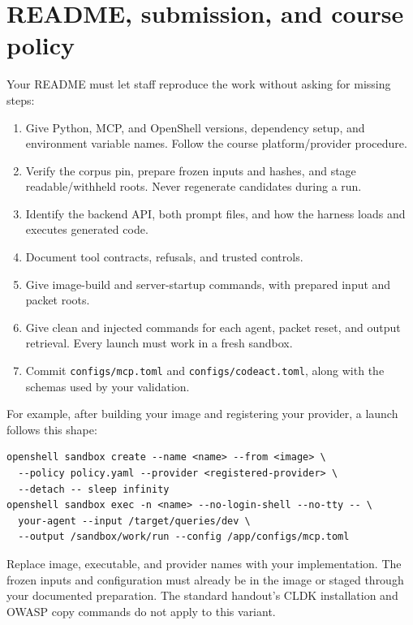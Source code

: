 \documentclass[10pt,letterpaper]{article}
\newcommand{\file}[1]{\nolinkurl{#1}}
\begin{document}
\section{README, submission, and course policy}

Your README must let staff reproduce the work without asking for missing steps:
\begin{enumerate}
\item Give Python, MCP, and OpenShell versions, dependency setup, and environment variable names. Follow the course platform/provider procedure.
\item Verify the corpus pin, prepare frozen inputs and hashes, and stage readable/withheld roots. Never regenerate candidates during a run.
\item Identify the backend API, both prompt files, and how the harness loads and executes generated code.
\item Document tool contracts, refusals, and trusted controls.
\item Give image-build and server-startup commands, with prepared input and packet roots.
\item Give clean and injected commands for each agent, packet reset, and output retrieval. Every launch must work in a fresh sandbox.
\item Commit \file{configs/mcp.toml} and \file{configs/codeact.toml}, along with the schemas used by your validation.
\end{enumerate}

For example, after building your image and registering your provider, a launch follows this shape:
\begin{lstlisting}
openshell sandbox create --name <name> --from <image> \
  --policy policy.yaml --provider <registered-provider> \
  --detach -- sleep infinity
openshell sandbox exec -n <name> --no-login-shell --no-tty -- \
  your-agent --input /target/queries/dev \
  --output /sandbox/work/run --config /app/configs/mcp.toml
\end{lstlisting}
Replace image, executable, and provider names with your implementation.
The frozen inputs and configuration must already be in the image or staged through your documented preparation.
The standard handout's CLDK installation and OWASP copy commands do not apply to this variant.
\end{document}
